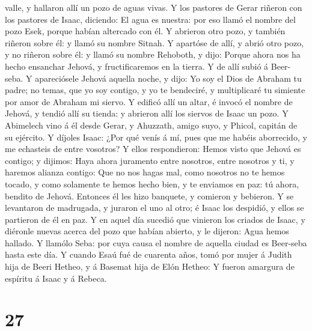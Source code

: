 valle, y hallaron allí un pozo de aguas vivas.  Y los
pastores de Gerar riñeron con los pastores de Isaac, diciendo: El agua
es nuestra: por eso llamó el nombre del pozo Esek, porque habían
altercado con él.  Y abrieron otro pozo, y también
riñeron sobre él: y llamó su nombre Sitnah.  Y apartóse
de allí, y abrió otro pozo, y no riñeron sobre él: y llamó su nombre
Rehoboth, y dijo: Porque ahora nos ha hecho ensanchar Jehová, y
fructificaremos en la tierra.  Y de allí subió á
Beer-seba.  Y apareciósele Jehová aquella noche, y dijo:
Yo soy el Dios de Abraham tu padre; no temas, que yo soy contigo, y yo
te bendeciré, y multiplicaré tu simiente por amor de Abraham mi siervo.
 Y edificó allí un altar, é invocó el nombre de Jehová, y
tendió allí su tienda: y abrieron allí los siervos de Isaac un pozo.
 Y Abimelech vino á él desde Gerar, y Ahuzzath, amigo
suyo, y Phicol, capitán de su ejército.  Y díjoles Isaac:
¿Por qué venís á mí, pues que me habéis aborrecido, y me echasteis de
entre vosotros?  Y ellos respondieron: Hemos visto que
Jehová es contigo; y dijimos: Haya ahora juramento entre nosotros, entre
nosotros y ti, y haremos alianza contigo:  Que no nos
hagas mal, como nosotros no te hemos tocado, y como solamente te hemos
hecho bien, y te enviamos en paz: tú ahora, bendito de Jehová.
 Entonces él les hizo banquete, y comieron y bebieron.
 Y se levantaron de madrugada, y juraron el uno al otro;
é Isaac los despidió, y ellos se partieron de él en paz. 
Y en aquel día sucedió que vinieron los criados de Isaac, y diéronle
nuevas acerca del pozo que habían abierto, y le dijeron: Agua hemos
hallado.  Y llamólo Seba: por cuya causa el nombre de
aquella ciudad es Beer-seba hasta este día.  Y cuando
Esaú fué de cuarenta años, tomó por mujer á Judith hija de Beeri Hetheo,
y á Basemat hija de Elón Hetheo:  Y fueron amargura de
espíritu á Isaac y á Rebeca.

\hypertarget{section-26}{%
\section{27}\label{section-26}}

